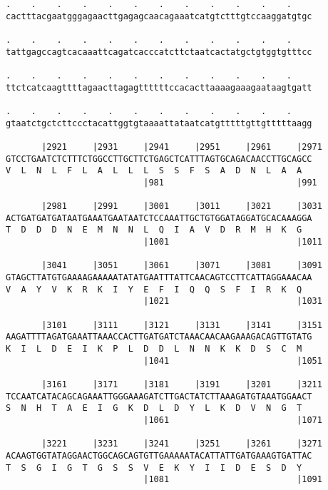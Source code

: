\documentclass{article}
\begin{document}
\begin{Verbatim}
.    .    .    .    .    .    .    .    .    .    .    .    
cactttacgaatgggagaacttgagagcaacagaaatcatgtctttgtccaaggatgtgc
                                                            
.    .    .    .    .    .    .    .    .    .    .    .    
tattgagccagtcacaaattcagatcacccatcttctaatcactatgctgtggtgtttcc
                                                            
.    .    .    .    .    .    .    .    .    .    .    .    
ttctcatcaagttttagaacttagagttttttccacacttaaaagaaagaataagtgatt
                                                            
.    .    .    .    .    .    .    .    .    .    .    .    
gtaatctgctcttccctacattggtgtaaaattataatcatgtttttgttgtttttaagg
                                                            
       |2921     |2931     |2941     |2951     |2961     |2971
GTCCTGAATCTCTTTCTGGCCTTGCTTCTGAGCTCATTTAGTGCAGACAACCTTGCAGCC
V  L  N  L  F  L  A  L  L  L  S  S  F  S  A  D  N  L  A  A  
                           |981                          |991
  
       |2981     |2991     |3001     |3011     |3021     |3031
ACTGATGATGATAATGAAATGAATAATCTCCAAATTGCTGTGGATAGGATGCACAAAGGA
T  D  D  D  N  E  M  N  N  L  Q  I  A  V  D  R  M  H  K  G  
                           |1001                         |1011
  
       |3041     |3051     |3061     |3071     |3081     |3091
GTAGCTTATGTGAAAAGAAAAATATATGAATTTATTCAACAGTCCTTCATTAGGAAACAA
V  A  Y  V  K  R  K  I  Y  E  F  I  Q  Q  S  F  I  R  K  Q  
                           |1021                         |1031
  
       |3101     |3111     |3121     |3131     |3141     |3151
AAGATTTTAGATGAAATTAAACCACTTGATGATCTAAACAACAAGAAAGACAGTTGTATG
K  I  L  D  E  I  K  P  L  D  D  L  N  N  K  K  D  S  C  M  
                           |1041                         |1051
  
       |3161     |3171     |3181     |3191     |3201     |3211
TCCAATCATACAGCAGAAATTGGGAAAGATCTTGACTATCTTAAAGATGTAAATGGAACT
S  N  H  T  A  E  I  G  K  D  L  D  Y  L  K  D  V  N  G  T  
                           |1061                         |1071
  
       |3221     |3231     |3241     |3251     |3261     |3271
ACAAGTGGTATAGGAACTGGCAGCAGTGTTGAAAAATACATTATTGATGAAAGTGATTAC
T  S  G  I  G  T  G  S  S  V  E  K  Y  I  I  D  E  S  D  Y  
                           |1081                         |1091
  

\end{Verbatim}
\end{document}
